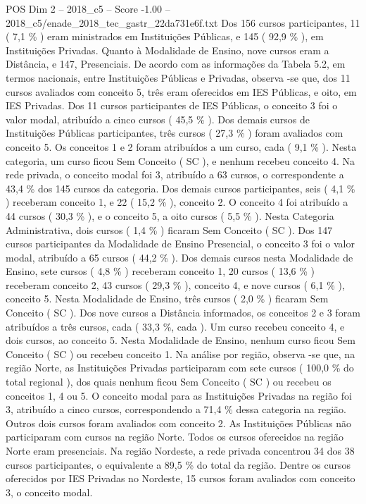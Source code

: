 \begin{textsample}{POS Dim 2 – 2018\_c5 – Score -1.00 – 2018\_c5/enade\_2018\_tec\_gastr\_22da731e6f.txt}
Dos 156 cursos participantes, 11 ( 7,1 \% ) eram ministrados em Instituições Públicas, e 145 ( 92,9 \% ), em Instituições Privadas.
Quanto à Modalidade de Ensino, nove cursos eram a Distância, e 147, Presenciais.
De acordo com as informações da Tabela 5.2, em termos nacionais, entre Instituições Públicas e Privadas, observa -se que, dos 11 cursos avaliados com conceito 5, três eram oferecidos em IES Públicas, e oito, em IES Privadas.
Dos 11 cursos participantes de IES Públicas, o conceito 3 foi o valor modal, atribuído a cinco cursos ( 45,5 \% ).
Dos demais cursos de Instituições Públicas participantes, três cursos ( 27,3 \% ) foram avaliados com conceito 5.
Os conceitos 1 e 2 foram atribuídos a um curso, cada ( 9,1 \% ).
Nesta categoria, um curso ficou Sem Conceito ( SC ), e nenhum recebeu conceito 4.
Na rede privada, o conceito modal foi 3, atribuído a 63 cursos, o correspondente a 43,4 \% dos 145 cursos da categoria.
Dos demais cursos participantes, seis ( 4,1 \% ) receberam conceito 1, e 22 ( 15,2 \% ), conceito 2.
O conceito 4 foi atribuído a 44 cursos ( 30,3 \% ), e o conceito 5, a oito cursos ( 5,5 \% ).
Nesta Categoria Administrativa, dois cursos ( 1,4 \% ) ficaram Sem Conceito ( SC ).
Dos 147 cursos participantes da Modalidade de Ensino Presencial, o conceito 3 foi o valor modal, atribuído a 65 cursos ( 44,2 \% ).
Dos demais cursos nesta Modalidade de Ensino, sete cursos ( 4,8 \% ) receberam conceito 1, 20 cursos ( 13,6 \% ) receberam conceito 2, 43 cursos ( 29,3 \% ), conceito 4, e nove cursos ( 6,1 \% ), conceito 5.
Nesta Modalidade de Ensino, três cursos ( 2,0 \% ) ficaram Sem Conceito ( SC ).
Dos nove cursos a Distância informados, os conceitos 2 e 3 foram atribuídos a três cursos, cada ( 33,3 \%, cada ).
Um curso recebeu conceito 4, e dois cursos, ao conceito 5.
Nesta Modalidade de Ensino, nenhum curso ficou Sem Conceito ( SC ) ou recebeu conceito 1.
Na análise por região, observa -se que, na região Norte, as Instituições Privadas participaram com sete cursos ( 100,0 \% do total regional ), dos quais nenhum ficou Sem Conceito ( SC ) ou recebeu os conceitos 1, 4 ou 5.
O conceito modal para as Instituições Privadas na região foi 3, atribuído a cinco cursos, correspondendo a 71,4 \% dessa categoria na região.
Outros dois cursos foram avaliados com conceito 2.
As Instituições Públicas não participaram com cursos na região Norte.
Todos os cursos oferecidos na região Norte eram presenciais.
Na região Nordeste, a rede privada concentrou 34 dos 38 cursos participantes, o equivalente a 89,5 \% do total da região.
Dentre os cursos oferecidos por IES Privadas no Nordeste, 15 cursos foram avaliados com conceito 3, o conceito modal.

\end{textsample}

